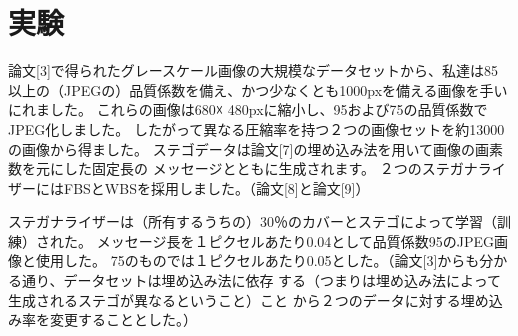 \documentclass[a4j,fleqn,10pt]{jsarticle}
\begin{document}
\section{実験}
論文[3]で得られたグレースケール画像の大規模なデータセットから、私達は85
以上の（JPEGの）品質係数を備え、かつ少なくとも1000pxを備える画像を手いにれました。
これらの画像は680☓ 480pxに縮小し、95および75の品質係数でJPEG化しました。
したがって異なる圧縮率を持つ２つの画像セットを約13000の画像から得ました。
ステゴデータは論文[7]の埋め込み法を用いて画像の画素数を元にした固定長の
メッセージとともに生成されます。
２つのステガナライザーにはFBSとWBSを採用しました。（論文[8]と論文[9]）

ステガナライザーは（所有するうちの）30％のカバーとステゴによって学習（訓
練）された。
メッセージ長を１ピクセルあたり0.04として品質係数95のJPEG画像と使用した。
75のものでは１ピクセルあたり0.05とした。（論文[3]からも分かる通り、データセットは埋め込み法に依存
する（つまりは埋め込み法によって生成されるステゴが異なるということ）こと
から２つのデータに対する埋め込み率を変更することとした。）
\end{document}
